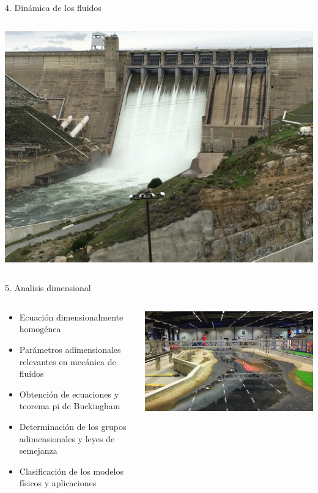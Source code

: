 \documentclass [xcolor=svgnames, t] {beamer}
\begin{document}
\begin{frame}{4. Din\'amica de los fluidos}
\begin{columns}
\begin{center}
\includegraphics[width=\textwidth]{fmd1}
\end{center}
\end{columns}

\end{frame}

\begin{frame}{5. Analisis dimensional}
\begin{columns}
\begin{exampleblock}{}
\begin{itemize}
\item Ecuación dimensionalmente homogénea
\item Parámetros adimensionales relevantes en mecánica de fluidos
\item Obtención de ecuaciones y teorema pi de Buckingham
\item Determinación de los grupos adimensionales y leyes de semejanza
\item Clasificación de los modelos físicos y aplicaciones
\end{itemize}
\end{exampleblock}
\begin{center}
\includegraphics[width=\textwidth]{dimana}
\end{center}
\end{columns}
\end{frame}
\end{document}
